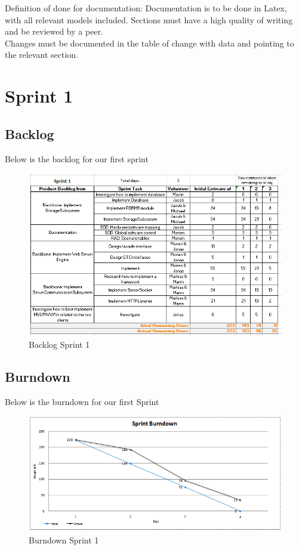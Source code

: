 \noindent Definition of done for documentation:
Documentation is to be done in Latex, with all relevant models included. Sections must have a high quality of writing and be reviewed by a peer. \\
Changes must be documented in the table of change with data and pointing to the relevant section.


\section{Sprint 1}
\label{chap:Spring 1}


\subsection{Backlog}
Below is the backlog for our first sprint
\begin{figure}[h]
\begin{center}
\includegraphics[scale=0.75]{img/SCRUM/backlogSprint1.png}
\caption{Backlog Sprint 1}
\label{fig:Backlog Sprint 1}
\end{center}
\end{figure}

\newpage
\subsection{Burndown}
Below is the burndown for our first Sprint
\begin{figure}[h]
\includegraphics[scale=0.7]{img/SCRUM/burndownSprint1.png}
\caption{Burndown Sprint 1}
\label{fig:Burndown Sprint 1}
\end{figure}


